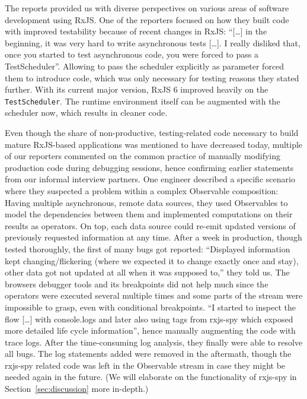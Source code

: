 \documentclass[12pt,a4paper]{article}
\begin{document}
The reports provided us with diverse perspectives on various areas of software development using RxJS. One of the reporters focused on how they built code with improved testability because of recent changes in RxJS: ``[\dots] in the beginning, it was very hard to write asynchronous tests [\dots]. I really disliked that, once you started to test asynchronous code, you were forced to pass a TestScheduler''. Allowing to pass the scheduler explicitly as parameter forced them to introduce code, which was only necessary for testing reasons they stated further. With its current major version, RxJS 6 improved heavily on the  \texttt{TestScheduler}. The runtime environment itself can be augmented with the scheduler now, which results in cleaner code.

Even though the share of non-productive, testing-related code necessary to build mature RxJS-based applications was mentioned to have decreased today, multiple of our reporters commented on the common practice of manually modifying production code during debugging sessions, hence confirming earlier statements from our informal interview partners. One engineer described a specific scenario where they suspected a problem within a complex Observable composition: Having multiple asynchronous, remote data sources, they used Observables to model the dependencies between them and implemented computations on their results as operators. On top, each data source could re-emit updated versions of previously requested information at any time. After a week in production, though tested thoroughly, the first of many bugs got reported: ``Displayed information kept changing/flickering (where we expected it to change exactly once and stay), other data got not updated at all when it was supposed to,'' they told us. The browsers debugger tools and its breakpoints did not help much since the operators were executed several multiple times and some parts of the stream were impossible to grasp, even with conditional breakpoints. ``I started to inspect the flow [\dots] with console.logs and later also using tags from rxjs-spy which exposed more detailed life cycle information'', hence manually augmenting the code with trace logs. After the time-consuming log analysis, they finally were able to resolve all bugs. The log statements added were removed in the aftermath, though the rxjs-spy related code was left in the Observable stream in case they might be needed again in the future. (We will elaborate on the functionality of rxjs-spy in Section~\ref{sec:discussion} more in-depth.)
\end{document}
